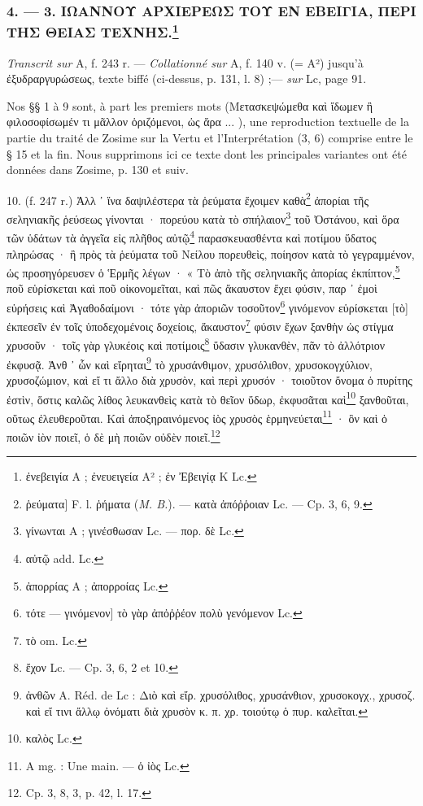 \documentclass[a4paper, 11pt, oneside, polutonikogreek, french]{article}
\begin{document}
\bigskip
\centerline{\EightStarTaper}
\centerline{\EightStarTaper\EightStarTaper}
\bigskip

\subsubsection[4. --- 3. ΙΩΑΝΝΟΥ ΑΡΧΙΕΡΕΩΣ ΤΟΥ ΕΝ ΕΒΕΙΓΙΑ, ΠΕΡΙ ΤΗΣ ΘΕΙΑΣ ΤΕΧΝΗΣ.]{4. --- 3. ΙΩΑΝΝΟΥ ΑΡΧΙΕΡΕΩΣ ΤΟΥ ΕΝ ΕΒΕΙΓΙΑ, ΠΕΡΙ ΤΗΣ ΘΕΙΑΣ ΤΕΧΝΗΣ.\footnote{ἐνεβειγία A ; ἐνευειγεία A² ; ἐν Ἐβειγίᾳ K Lc.}}

\emph{Transcrit sur} A, f. 243 r. --- \emph{Collationné sur} A, f. 140 v. (= A²) jusqu'à ἐξυδραργυρώσεως, texte biffé (ci-dessus, p. 131, l. 8) ;--- \emph{sur} Lc, page 91.

Nos §§ 1 à 9 sont, à part les premiers mots (Μετασκεψώμεθα καὶ ἴδωμεν ἢ φιλοσοφίσωμέν τι μᾶλλον ὁριζόμενοι, ὡς ἄρα ... ), une reproduction textuelle de la partie du traité de Zosime sur la Vertu et l'Interprétation (3, 6) comprise entre le § 15 et la fin. Nous supprimons ici ce texte dont les principales variantes ont été données dans Zosime, p. 130 et suiv.

10. (f. 247 r.) Ἀλλ ᾽ ἵνα δαψιλέστερα τὰ ῥεύματα ἔχοιμεν καθὰ\footnote{ῥεύματα] F. l. ῥήματα (\emph{M. B.}). --- κατὰ ἀπόῤῥοιαν Lc. --- Cp. 3, 6, 9.} ἀπορίαι τῆς σεληνιακῆς ῥεύσεως γίνονται · πορεύου κατὰ τὸ σπήλαιον\footnote{γίνωνται A ; γινέσθωσαν Lc. --- πορ. δὲ Lc.} τοῦ Ὀστάνου, καὶ ὅρα τῶν ὑδάτων τὰ ἀγγεῖα εἰς πλῆθος αὐτῷ\footnote{αὐτῷ add. Lc.} παρασκευασθέντα καὶ ποτίμου ὕδατος πληρώσας · ἢ πρὸς τὰ ῥεύματα τοῦ Νείλου πορευθεὶς, ποίησον κατὰ τὸ γεγραμμένον, ὡς προσηγόρευσεν ὁ Ἑρμῆς λέγων · « Τὸ ἀπὸ τῆς σεληνιακῆς ἀπορίας ἐκπίπτον,\footnote{ἀπορρίας A ; ἀπορροίας Lc.} ποῦ εὑρίσκεται καὶ ποῦ οἰκονομεῖται, καὶ πῶς ἄκαυστον ἔχει φύσιν, παρ ᾽ ἐμοὶ εὑρήσεις καὶ Ἀγαθοδαίμονι · τότε γὰρ ἀποριῶν τοσοῦτον\footnote{τότε --- γινόμενον] τὸ γὰρ ἀπὀῤῥέον πολὺ γενόμενον Lc.} γινόμενον εὑρίσκεται [τὸ] ἐκπεσεῖν ἐν τοῖς ὑποδεχομένοις δοχείοις, ἄκαυστον\footnote{τὸ om. Lc.} φύσιν ἔχων ξανθὴν ὡς στίγμα χρυσοῦν · τοῖς γὰρ γλυκέοις καὶ ποτίμοις\footnote{ἔχον Lc. --- Cp. 3, 6, 2 et 10.} ὕδασιν γλυκανθὲν, πᾶν τὸ ἀλλότριον ἐκφυσᾷ. Ἀνθ ᾽ ὧν καὶ εἴρηται\footnote{ἀνθῶν A. Réd. de Lc : Διὸ καὶ εἴρ. χρυσόλιθος, χρυσάνθιον, χρυσοκογχ., χρυσοζ. καὶ εἴ τινι ἄλλῳ ὀνόματι διὰ χρυσὸν κ. π. χρ. τοιούτῳ ὁ πυρ. καλεῖται.} τὸ χρυσάνθιμον, χρυσόλιθον, χρυσοκογχύλιον, χρυσοζώμιον, καὶ εἴ τι ἄλλο διὰ χρυσὸν, καὶ περὶ χρυσόν · τοιοῦτον ὄνομα ὁ πυρίτης ἐστὶν, ὅστις καλῶς λίθος λευκανθεὶς κατὰ τὸ θεῖον ὕδωρ, ἐκφυσᾶται καὶ\footnote{καλὸς Lc.} ξανθοῦται, οὕτως ἐλευθεροῦται. Καὶ ἀποξηραινόμενος ἰὸς χρυσὸς ἑρμηνεύεται\footnote{A mg. : Une main. --- ὁ ἰὸς Lc.} · ὃν καὶ ὁ ποιῶν ἰὸν ποιεῖ, ὁ δὲ μὴ ποιῶν οὐδὲν ποιεῖ.\footnote{Cp. 3, 8, 3, p. 42, l. 17.}
\end{document}

